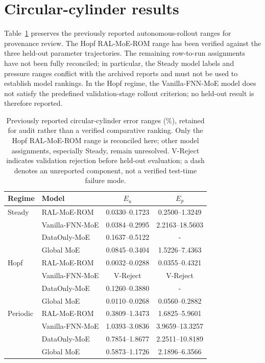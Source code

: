 \section{Circular-cylinder results}
\label{app:circular}

Table~\ref{tab:circular_full} preserves the previously reported autonomous-rollout ranges for provenance review. The Hopf RAL-MoE-ROM range has been verified against the three held-out parameter trajectories. The remaining row-to-run assignments have not been fully reconciled; in particular, the Steady model labels and pressure ranges conflict with the archived reports and must not be used to establish model rankings. In the Hopf regime, the Vanilla-FNN-MoE model does not satisfy the predefined validation-stage rollout criterion; no held-out result is therefore reported.

\par
\begin{table}[H]
\centering
\caption{Previously reported circular-cylinder error ranges (\%), retained for audit rather than a verified comparative ranking. Only the Hopf RAL-MoE-ROM range is reconciled here; other model assignments, especially Steady, remain unresolved. V-Reject indicates validation rejection before held-out evaluation; a dash denotes an unreported component, not a verified test-time failure mode.}
\label{tab:circular_full}
\small
\setlength{\tabcolsep}{4pt}
\begin{tabular}{llcc}
\toprule
Regime & Model & $E_u$ & $E_p$ \\
\midrule
Steady & RAL-MoE-ROM & 0.0330--0.1723 & 0.2500--1.3249 \\
 & Vanilla-FNN-MoE & 0.0384--0.2995 & 2.2163--18.5603 \\
 & DataOnly-MoE & 0.1637--0.5122 & - \\
 & Global MoE & 0.0845--0.3404 & 1.5226--7.4363 \\
\midrule
Hopf & RAL-MoE-ROM & 0.0032--0.0288 & 0.0355--0.4321 \\
 & Vanilla-FNN-MoE & V-Reject & V-Reject  \\
 & DataOnly-MoE & 0.1260--0.3880 & - \\
 & Global MoE & 0.0110--0.0268 & 0.0560--0.2882 \\
\midrule
Periodic & RAL-MoE-ROM & 0.3809--1.3473 & 1.6825--5.9601 \\
 & Vanilla-FNN-MoE & 1.0393--3.0836 & 3.9659--13.3257 \\
 & DataOnly-MoE & 0.7854--1.8677 & 2.2511--10.8189 \\
 & Global MoE & 0.5873--1.1726 & 2.1896--6.3566 \\
\bottomrule
\end{tabular}
\end{table}
\par


